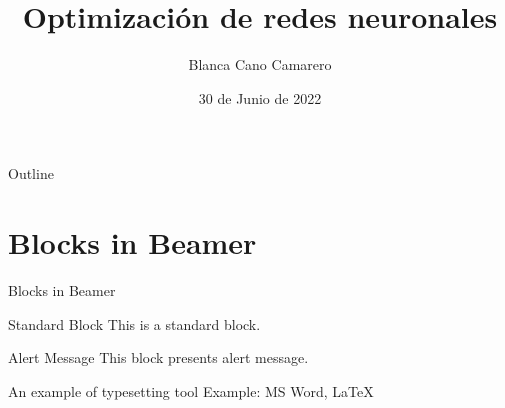 \documentclass{beamer}
\title{Optimización de redes neuronales}
\author{Blanca Cano Camarero}
\date{30 de Junio de 2022}
\begin{document}
\begin{frame}
    \titlepage 
\end{frame}

\begin{frame}{Outline}
    \tableofcontents
\end{frame}

\section{Blocks in Beamer}
\begin{frame}{Blocks in Beamer}
    \begin{block}{Standard Block}
        This is a standard block.
    \end{block}
    \begin{alertblock}{Alert Message}
        This block presents alert message.
    \end{alertblock}
    \begin{exampleblock}{An example of typesetting tool}
        Example: MS Word, \LaTeX{}
    \end{exampleblock}
\end{frame}
\end{document}
